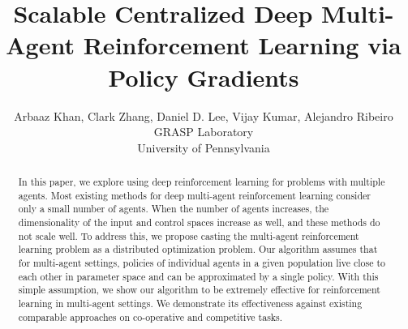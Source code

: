 \documentclass{article}
\title{Scalable Centralized Deep Multi-Agent Reinforcement Learning via Policy Gradients}
\author{
  Arbaaz Khan, Clark Zhang, Daniel D. Lee, Vijay Kumar, Alejandro Ribeiro \\
  GRASP Laboratory\\
  University of Pennsylvania\\
}
\begin{document}

\maketitle
 
\begin{abstract}
In this paper, we explore using deep reinforcement learning for problems with multiple agents. Most existing methods for deep multi-agent reinforcement learning consider only a small number of agents. When the number of agents increases, the dimensionality of the input and control spaces increase as well, and these methods do not scale well. To address this, we propose casting the multi-agent reinforcement learning problem as a distributed optimization problem. Our algorithm assumes that for multi-agent settings, policies of individual agents in a given population live close to each other in parameter space and can be approximated by a single policy. With this simple assumption, we show our algorithm to be extremely effective for reinforcement learning in multi-agent settings. We demonstrate its effectiveness against existing comparable approaches on co-operative and competitive tasks. 
\end{abstract}
\end{document}
